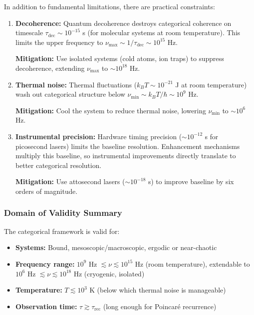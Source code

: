 \documentclass[twocolumn,10pt]{article}
\theoremstyle{remark}
\begin{document}
In addition to fundamental limitations, there are practical constraints:

\begin{enumerate}
    \item \textbf{Decoherence:} Quantum decoherence destroys categorical coherence on timescale $\tau_{\text{dec}} \sim 10^{-15}$ s (for molecular systems at room temperature). This limits the upper frequency to $\nu_{\max} \sim 1/\tau_{\text{dec}} \sim 10^{15}$ Hz.
    
    \textbf{Mitigation:} Use isolated systems (cold atoms, ion traps) to suppress decoherence, extending $\nu_{\max}$ to $\sim 10^{18}$ Hz.
    
    \item \textbf{Thermal noise:} Thermal fluctuations ($k_B T \sim 10^{-21}$ J at room temperature) wash out categorical structure below $\nu_{\min} \sim k_B T/\hbar \sim 10^{9}$ Hz.
    
    \textbf{Mitigation:} Cool the system to reduce thermal noise, lowering $\nu_{\min}$ to $\sim 10^{6}$ Hz.
    
    \item \textbf{Instrumental precision:} Hardware timing precision ($\sim 10^{-12}$ s for picosecond lasers) limits the baseline resolution. Enhancement mechanisms multiply this baseline, so instrumental improvements directly translate to better categorical resolution.
    
    \textbf{Mitigation:} Use attosecond lasers ($\sim 10^{-18}$ s) to improve baseline by six orders of magnitude.
\end{enumerate}

\subsubsection{Domain of Validity Summary}

The categorical framework is valid for:
\begin{itemize}
    \item \textbf{Systems:} Bound, mesoscopic/macroscopic, ergodic or near-chaotic
    \item \textbf{Frequency range:} $10^{9}$ Hz $\lesssim \nu \lesssim 10^{15}$ Hz (room temperature), extendable to $10^{6}$ Hz $\lesssim \nu \lesssim 10^{18}$ Hz (cryogenic, isolated)
    \item \textbf{Temperature:} $T \lesssim 10^3$ K (below which thermal noise is manageable)
    \item \textbf{Observation time:} $\tau \gtrsim \tau_{\text{rec}}$ (long enough for Poincaré recurrence)
\end{itemize}
\end{document}
